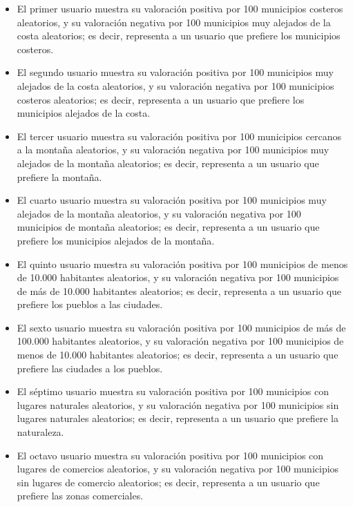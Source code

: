 \begin{itemize}
    \item El primer usuario muestra su valoración positiva por 100 municipios costeros aleatorios, y su valoración negativa por 100 municipios muy alejados de la costa aleatorios; es decir, representa a un usuario que prefiere los municipios costeros.

    \item El segundo usuario muestra su valoración positiva por 100 municipios muy alejados de la costa aleatorios, y su valoración negativa por 100 municipios costeros aleatorios; es decir, representa a un usuario que prefiere los municipios alejados de la costa.

    \item El tercer usuario muestra su valoración positiva por 100 municipios cercanos a la montaña aleatorios, y su valoración negativa por 100 municipios muy alejados de la montaña aleatorios; es decir, representa a un usuario que prefiere la montaña.
    
    \item El cuarto usuario muestra su valoración positiva por 100 municipios muy alejados de la montaña aleatorios, y su valoración negativa por 100 municipios de montaña aleatorios; es decir, representa a un usuario que prefiere los municipios alejados de la montaña.

    \item El quinto usuario muestra su valoración positiva por 100 municipios de menos de 10.000 habitantes aleatorios, y su valoración negativa por 100 municipios de más de 10.000 habitantes aleatorios; es decir, representa a un usuario que prefiere los pueblos a las ciudades.

    \item El sexto usuario muestra su valoración positiva por 100 municipios de más de 100.000 habitantes aleatorios, y su valoración negativa por 100 municipios de menos de 10.000 habitantes aleatorios; es decir, representa a un usuario que prefiere las ciudades a los pueblos.

    \item El séptimo usuario muestra su valoración positiva por 100 municipios con lugares naturales aleatorios, y su valoración negativa por 100 municipios sin lugares naturales aleatorios; es decir, representa a un usuario que prefiere la naturaleza.

    \item El octavo usuario muestra su valoración positiva por 100 municipios con lugares de comercios aleatorios, y su valoración negativa por 100 municipios sin lugares de comercio aleatorios; es decir, representa a un usuario que prefiere las zonas comerciales.


\end{itemize}
